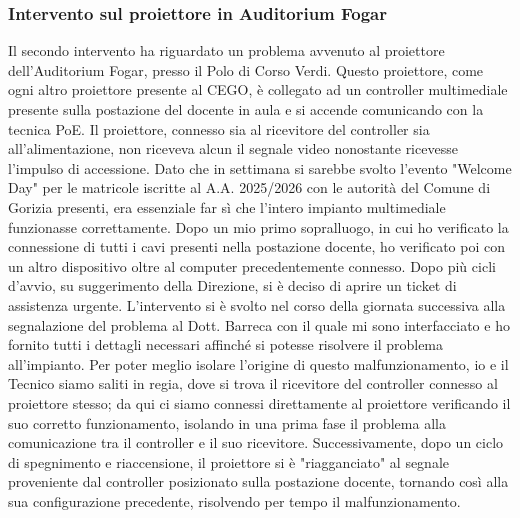             \subsubsection{Intervento sul proiettore in Auditorium Fogar}
                    Il secondo intervento ha riguardato un problema avvenuto al proiettore dell'Auditorium Fogar, presso il Polo di Corso Verdi. Questo proiettore, come ogni altro proiettore presente al CEGO, è collegato ad un controller multimediale presente sulla postazione del docente in aula e si accende comunicando con la tecnica PoE. \newline
                    Il proiettore, connesso sia al ricevitore del controller sia all'alimentazione, non riceveva alcun il segnale video nonostante ricevesse l'impulso di accessione. Dato che in settimana si sarebbe svolto l'evento "Welcome Day" per le matricole iscritte al A.A. 2025/2026 con le autorità del Comune di Gorizia presenti, era essenziale far sì che l'intero impianto multimediale funzionasse correttamente. Dopo un mio primo sopralluogo, in cui ho verificato la connessione di tutti i cavi presenti nella postazione docente, ho verificato poi con un altro dispositivo oltre al computer precedentemente connesso. Dopo più cicli d'avvio, su suggerimento della Direzione, si è deciso di aprire un ticket di assistenza urgente. \newline
                    L'intervento si è svolto nel corso della giornata successiva alla segnalazione del problema al Dott. Barreca con il quale mi sono interfacciato e ho fornito tutti i dettagli necessari affinché si potesse risolvere il problema all'impianto. Per poter meglio isolare l'origine di questo malfunzionamento, io e il Tecnico siamo saliti in regia, dove si trova il ricevitore del controller connesso al proiettore stesso; da qui ci siamo connessi direttamente al proiettore verificando il suo corretto funzionamento, isolando in una prima fase il problema alla comunicazione tra il controller e il suo ricevitore. Successivamente, dopo un ciclo di spegnimento e riaccensione, il proiettore si è "riagganciato" al segnale proveniente dal controller posizionato sulla postazione docente, tornando così alla sua configurazione precedente, risolvendo per tempo il malfunzionamento.
                \par
